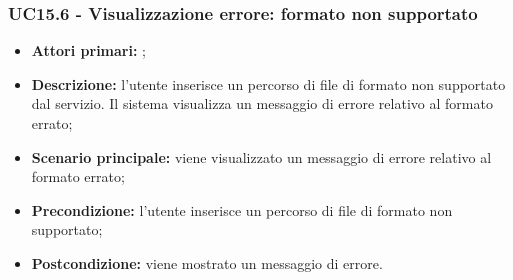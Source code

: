 \subsubsection{UC15.6 - Visualizzazione errore: formato non supportato}
\begin{itemize}
	\item \textbf{Attori primari:} \us{};
	\item \textbf{Descrizione:} l’utente inserisce un percorso di file di formato non supportato dal servizio. Il sistema visualizza un messaggio di errore relativo al formato errato;
	\item \textbf{Scenario principale:} viene visualizzato un messaggio di errore relativo al formato errato;
	\item \textbf{Precondizione:} l'utente inserisce un percorso di file di formato non supportato;
	\item \textbf{Postcondizione:} viene mostrato un messaggio di errore. 
\end{itemize}